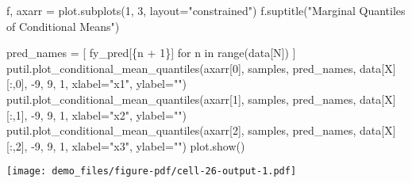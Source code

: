\documentclass[
  letterpaper,
  DIV=11,
  numbers=noendperiod]{scrartcl}
\newenvironment{Shaded}{\begin{snugshade}}{\end{snugshade}}
\newcommand{\BuiltInTok}[1]{\textcolor[rgb]{0.00,0.23,0.31}{#1}}
\newcommand{\ControlFlowTok}[1]{\textcolor[rgb]{0.00,0.23,0.31}{#1}}
\newcommand{\DecValTok}[1]{\textcolor[rgb]{0.68,0.00,0.00}{#1}}
\newcommand{\KeywordTok}[1]{\textcolor[rgb]{0.00,0.23,0.31}{#1}}
\newcommand{\NormalTok}[1]{\textcolor[rgb]{0.00,0.23,0.31}{#1}}
\newcommand{\OperatorTok}[1]{\textcolor[rgb]{0.37,0.37,0.37}{#1}}
\newcommand{\SpecialCharTok}[1]{\textcolor[rgb]{0.37,0.37,0.37}{#1}}
\newcommand{\SpecialStringTok}[1]{\textcolor[rgb]{0.13,0.47,0.30}{#1}}
\newcommand{\StringTok}[1]{\textcolor[rgb]{0.13,0.47,0.30}{#1}}
\begin{document}
\begin{Shaded}
\begin{Highlighting}[]
\NormalTok{f, axarr }\OperatorTok{=}\NormalTok{ plot.subplots(}\DecValTok{1}\NormalTok{, }\DecValTok{3}\NormalTok{, layout}\OperatorTok{=}\StringTok{"constrained"}\NormalTok{)}
\NormalTok{f.suptitle(}\StringTok{"Marginal Quantiles of Conditional Means"}\NormalTok{)}

\NormalTok{pred\_names }\OperatorTok{=}\NormalTok{ [ }\SpecialStringTok{f\textquotesingle{}y\_pred[}\SpecialCharTok{\{}\NormalTok{n }\OperatorTok{+} \DecValTok{1}\SpecialCharTok{\}}\SpecialStringTok{]\textquotesingle{}} \ControlFlowTok{for}\NormalTok{ n }\KeywordTok{in} \BuiltInTok{range}\NormalTok{(data[}\StringTok{\textquotesingle{}N\textquotesingle{}}\NormalTok{]) ]}
\NormalTok{putil.plot\_conditional\_mean\_quantiles(axarr[}\DecValTok{0}\NormalTok{], samples, pred\_names,}
\NormalTok{                                      data[}\StringTok{\textquotesingle{}X\textquotesingle{}}\NormalTok{][:,}\DecValTok{0}\NormalTok{], }\OperatorTok{{-}}\DecValTok{9}\NormalTok{, }\DecValTok{9}\NormalTok{, }\DecValTok{1}\NormalTok{,}
\NormalTok{                                      xlabel}\OperatorTok{=}\StringTok{"x1"}\NormalTok{, ylabel}\OperatorTok{=}\StringTok{""}\NormalTok{)}
\NormalTok{putil.plot\_conditional\_mean\_quantiles(axarr[}\DecValTok{1}\NormalTok{], samples, pred\_names,}
\NormalTok{                                      data[}\StringTok{\textquotesingle{}X\textquotesingle{}}\NormalTok{][:,}\DecValTok{1}\NormalTok{], }\OperatorTok{{-}}\DecValTok{9}\NormalTok{, }\DecValTok{9}\NormalTok{, }\DecValTok{1}\NormalTok{,}
\NormalTok{                                      xlabel}\OperatorTok{=}\StringTok{"x2"}\NormalTok{, ylabel}\OperatorTok{=}\StringTok{""}\NormalTok{)}
\NormalTok{putil.plot\_conditional\_mean\_quantiles(axarr[}\DecValTok{2}\NormalTok{], samples, pred\_names,}
\NormalTok{                                      data[}\StringTok{\textquotesingle{}X\textquotesingle{}}\NormalTok{][:,}\DecValTok{2}\NormalTok{], }\OperatorTok{{-}}\DecValTok{9}\NormalTok{, }\DecValTok{9}\NormalTok{, }\DecValTok{1}\NormalTok{,}
\NormalTok{                                      xlabel}\OperatorTok{=}\StringTok{"x3"}\NormalTok{, ylabel}\OperatorTok{=}\StringTok{""}\NormalTok{)}
\NormalTok{plot.show()}
\end{Highlighting}
\end{Shaded}

\texttt{[image: demo\_files/figure-pdf/cell-26-output-1.pdf]}
\end{document}
